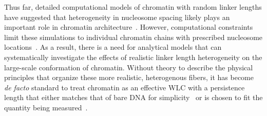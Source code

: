 \documentclass[%
 reprint,
superscriptaddress,
showpacs,preprintnumbers,
 amsmath,amssymb,
 aps,
 prl,
]{revtex4-1}
\begin{document}
Thus far, detailed computational models of chromatin with random
    linker lengths have suggested that heterogeneity in nucleosome spacing likely plays an
    important role in chromatin
    architecture~\cite{woodcock1993,collepardo-guevara2014,bascom2017a}.
However, computational constraints limit these simulations to individual
    chromatin chains with prescribed nucleosome
    locations~\cite{collepardo-guevara2014}.
As a result, there is
    a need for analytical models that can systematically
    investigate the effects of realistic linker length heterogeneity on the
    large-scale conformation of chromatin.
Without theory to describe the physical principles that organize these more realistic,
    heterogenous fibers, it has become \textit{de facto} standard to treat
    chromatin as an effective WLC with a persistence length that either matches
    that of bare DNA for
    simplicity~\cite{benedetti2017,macphersonInPress,nuebler2018} or is chosen
    to fit the quantity being measured~\cite{sanborn2015,pierro2017}.
\end{document}
